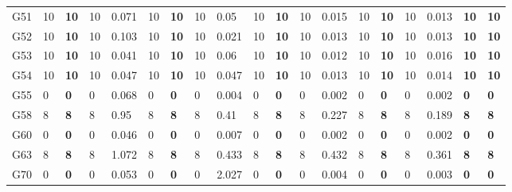 \documentclass[12pt, a4paper]{article}%
\numberwithin{equation}{section}
\theoremstyle{plain}
\begin{document}
{\begin{landscape}
\begin{longtable}{lllllllllllllllllll}
						G51                       & 10   & \textbf{10} & 10  & 0.071 & 10   & \textbf{10} & 10  & 0.05  & 10   & \textbf{10} & 10  & 0.015 & 10   & \textbf{10} & 10  & 0.013 & \textbf{10}             & \textbf{10}          \\
						G52                       & 10   & \textbf{10} & 10  & 0.103 & 10   & \textbf{10} & 10  & 0.021 & 10   & \textbf{10} & 10  & 0.013 & 10   & \textbf{10} & 10  & 0.013 & \textbf{10}             & \textbf{10}          \\
						G53                       & 10   & \textbf{10} & 10  & 0.041 & 10   & \textbf{10} & 10  & 0.06  & 10   & \textbf{10} & 10  & 0.012 & 10   & \textbf{10} & 10  & 0.016 & \textbf{10}             & \textbf{10}          \\
						G54                       & 10   & \textbf{10} & 10  & 0.047 & 10   & \textbf{10} & 10  & 0.047 & 10   & \textbf{10} & 10  & 0.013 & 10   & \textbf{10} & 10  & 0.014 & \textbf{10}             & \textbf{10}          \\
						G55                       & 0    & \textbf{0}  & 0   & 0.068 & 0    & \textbf{0}  & 0   & 0.004 & 0    & \textbf{0}  & 0   & 0.002 & 0    & \textbf{0}  & 0   & 0.002 & \textbf{0}              & \textbf{0}           \\
						G58                       & 8    & \textbf{8}  & 8   & 0.95  & 8    & \textbf{8}  & 8   & 0.41  & 8    & \textbf{8}  & 8   & 0.227 & 8    & \textbf{8}  & 8   & 0.189 & \textbf{8}              & \textbf{8}           \\
						G60                       & 0    & \textbf{0}  & 0   & 0.046 & 0    & \textbf{0}  & 0   & 0.007 & 0    & \textbf{0}  & 0   & 0.002 & 0    & \textbf{0}  & 0   & 0.002 & \textbf{0}              & \textbf{0}           \\
						G63                       & 8    & \textbf{8}  & 8   & 1.072 & 8    & \textbf{8}  & 8   & 0.433 & 8    & \textbf{8}  & 8   & 0.432 & 8    & \textbf{8}  & 8   & 0.361 & \textbf{8}              & \textbf{8}           \\
						G70                       & 0    & \textbf{0}  & 0   & 0.053 & 0    & \textbf{0}  & 0   & 2.027 & 0    & \textbf{0}  & 0   & 0.004 & 0    & \textbf{0}  & 0   & 0.003 & \textbf{0}              & \textbf{0}           \\ \hline
					\end{longtable}
				\end{landscape}
			}
			
\end{document}
